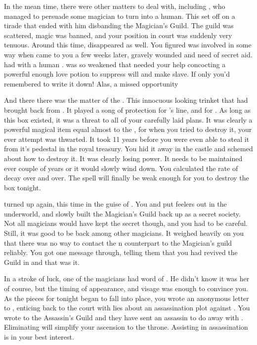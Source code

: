 \documentclass[char]{NeptuneBall}
\begin{document}
In the mean time, there were other matters to deal with, including \cAriel{\Prince} \cAriel{}, who managed to persuade some magician to turn \cAriel{\them} into a human. This set \cKing{} off on a tirade that ended with him disbanding the Magician's Guild. The guild was scattered, magic was banned, and your position in court was suddenly very tenuous. Around this time, \cWitch{} disappeared as well. You figured \cWitch{\they} was involved in some way when \cWitch{\they} came to you a few weeks later, gravely wounded and need of secret aid. \cWitch{\They} had with \cWitch{\them} a human \cSlave{\Prince}. \cWitch{} was so weakened that \cWitch{\they} needed your help concocting a powerful enough love potion to suppress \cSlave{\their} will and make \cSlave{\them} \cWitch{\them} slave. If only you'd remembered to write it down! Alas, a missed opportunity

And there there was the matter of the \iMusicBox{\MYname}. This innocuous looking trinket that \cQueen{} had brought back from \cNixie{}. It played a song of protection for \cKing{}'s line, and for \pAtlantis{}. As long as this box existed, it was a threat to all of your carefully laid plans. It was clearly a powerful magical item equal almost to the \iTrident{\MYname}, for when you tried to destroy it, your ever attempt was thwarted. It took 11 years before you were even able to steal it from it's pedestal in the royal treasury. You hid it away in the castle and schemed about how to destroy it. It was clearly losing power. It needs to be maintained ever couple of years or it would slowly wind down. You calculated the rate of decay over and over. The spell will finally be weak enough for you to destroy the box tonight.

\cWitch{} turned up again, this time in the guise of \cWitch{\MYname}. You and \cWitch{\they} put feelers out in the underworld, and slowly built the Magician's Guild back up as a secret society. Not all magicians would have kept the secret though, and you had to be careful. Still, it was good to be back among other magicians. It weighed heavily on you that there was no way to contact the \pPacifica{}n counterpart to the Magician's guild reliably. You got one message through, telling them that you had revived the Guild in \pAtlantis{} and that was it.

In a stroke of luck, one of the magicians had word of \cQueen{}. He didn't know it was her of course, but the timing of \cQueen{\them} appearance, and \cQueen{\them} visage was enough to convince you. As the pieces for tonight began to fall into place, you wrote an anonymous letter to \cQueen{}, enticing \cQueen{\them} back to the court with lies about an assassination plot against \cKing{}. You wrote to the Assassin's Guild and they have sent an assassin to do away with \cQueen{}. Eliminating \cQueen{} will simplify your ascension to the throne. Assisting in \cQueen{\them} assassination is in your best interest.
\end{document}
